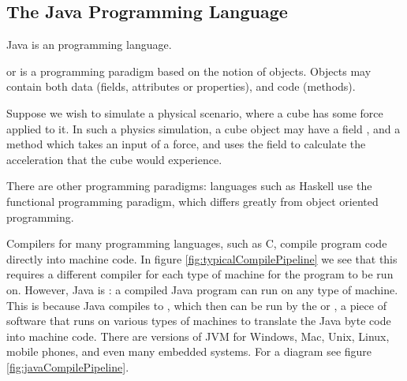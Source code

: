 \documentclass[11pt]{report}
\begin{document}
\subsection{The Java Programming Language}
Java is an  programming language. 
\begin{defi} \label{def:OOP}
     or  is a programming paradigm based on the notion of objects. Objects may contain both data (fields, attributes or properties), and code (methods).
\end{defi}
\begin{eg}
    Suppose we wish to simulate a physical scenario, where a cube has some force applied to it. In such a physics simulation, a cube object may have a field , and a method  which takes an input of a force, and uses the  field to calculate the acceleration that the cube would experience.
\end{eg}
There are other programming paradigms: languages such as Haskell use the functional programming paradigm, which differs greatly from object oriented programming.
\par Compilers for many programming languages, such as C, compile program code directly into machine code. In figure \ref{fig:typicalCompilePipeline} we see that this requires a different compiler for each type of machine for the program to be run on.
However, Java is : a compiled Java program can run on any type of machine. This is because Java compiles to , which then can be run by the  or , a piece of software that runs on various types of machines to translate the Java byte code into machine code. There are versions of JVM for Windows, Mac, Unix, Linux, mobile phones, and even many embedded systems. For a diagram see figure \ref{fig:javaCompilePipeline}.
\end{document}
